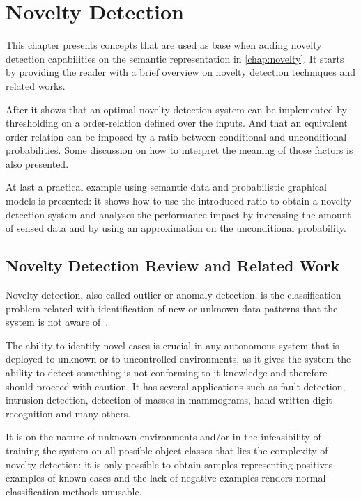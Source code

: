 \chapter{Novelty Detection}\label{chap:novelty-intro}

This chapter presents concepts that are used as base when adding novelty
detection capabilities on the semantic representation in \autoref{chap:novelty}.
It starts by providing the reader with a brief overview on novelty detection
techniques and related works.

After it shows that an optimal novelty detection system can be implemented by
thresholding on a order-relation defined over the inputs.
And that an equivalent order-relation can be imposed by a ratio between
conditional and unconditional probabilities.
Some discussion on how to interpret the meaning of those factors is also
presented.

At last a practical example using semantic data and probabilistic graphical
models is presented: it shows how to use the introduced ratio to obtain a
novelty detection system and analyses the performance impact by increasing
the amount of sensed data and by using an approximation on the unconditional
probability.


\section{Novelty Detection Review and Related Work}
Novelty detection, also called outlier or anomaly detection, is the
classification problem related with identification of new or unknown data
patterns that the system is not aware of~\cite{markou2003novelty}.

The ability to identify novel cases is crucial in any autonomous system
that is deployed to unknown or to uncontrolled environments, as it gives the
system the ability to detect something is not conforming to it knowledge and
therefore should proceed with caution.
It has several applications such as fault detection, intrusion detection,
detection of masses in mammograms, hand written digit recognition and many
others.

It is on the nature of unknown environments and/or in the infeasibility of
training the system on all possible object classes that lies the complexity of
novelty detection: it is only possible to obtain samples representing positives
examples of known cases and the lack of negative examples renders normal
classification methods unusable.

